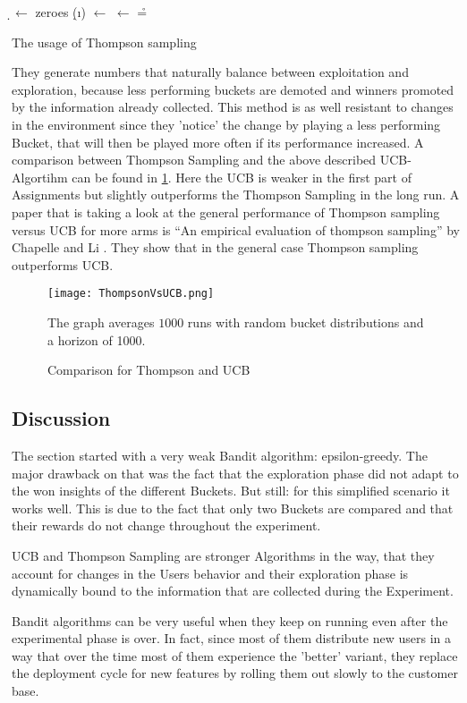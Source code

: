\documentclass[main.tex]{subfiles}
\begin{document}
\begin{algorithm}
\KwIn{\b}
\BlankLine
\d $\leftarrow$ zeroes \;
{
\d(\i) $\leftarrow$ \draw{\b{\i}}
}
\nb $\leftarrow$ \max{\d} \;
\r = \rw{\nb}\;

\caption[Thompson Sampling]{The usage of Thompson sampling}
\label{alg:ThompsonSampling}
\end{algorithm}

They generate numbers that naturally balance between exploitation and exploration, because less performing buckets are demoted and winners promoted by the information already collected. This method is as well resistant to changes in the environment since they 'notice' the change by playing a less performing Bucket, that will then be played more often if its performance increased. A comparison between Thompson Sampling and the above described UCB-Algortihm can be found in \ref{fig:ThompsonVsUCB}. Here the UCB is weaker in the first part of Assignments but slightly outperforms the Thompson Sampling in the long run. A paper that is taking a look at the general performance of Thompson sampling versus UCB for more arms is ``An empirical evaluation of thompson sampling'' by Chapelle and Li \cite{chapelle2011empirical}. They show that in the general case Thompson sampling outperforms UCB.

\begin{figure}[ht]
\texttt{[image: ThompsonVsUCB.png]}
\centering
\caption{Comparison for Thompson and UCB}
The graph averages $1000$ runs with random bucket distributions and a horizon of 1000.
\label{fig:ThompsonVsUCB}
\end{figure}

\subsection{Discussion}
The section started with a very weak Bandit algorithm: epsilon-greedy. The major drawback on that was the fact that the exploration phase did not adapt to the won insights of the different Buckets. But still: for this simplified scenario it works well. This is due to the fact that only two Buckets are compared and that their rewards do not change throughout the experiment.

UCB and Thompson Sampling are stronger Algorithms in the way, that they account for changes in the Users behavior and their exploration phase is dynamically bound to the information that are collected during the Experiment.

Bandit algorithms can be very useful when they keep on running even after the experimental phase is over. In fact, since most of them distribute new users in a way that over the time most of them experience the 'better' variant, they replace the deployment cycle for new features by rolling them out slowly to the customer base.
\end{document}
